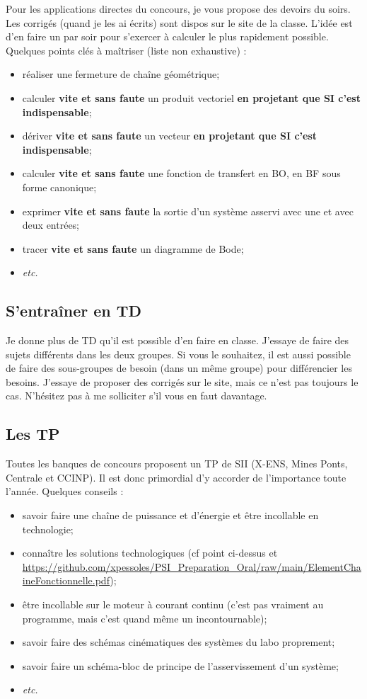 Pour les applications directes du concours, je vous propose des devoirs du soirs. Les corrigés (quand je les ai écrits) sont dispos sur le site de la classe. L'idée est d'en faire un par soir pour s'exercer à calculer le plus rapidement possible. Quelques points clés à maîtriser (liste non exhaustive) : 
\begin{itemize}
\item réaliser une fermeture de chaîne géométrique;
\item calculer \textbf{vite et sans faute} un produit vectoriel \textbf{en projetant que SI c'est indispensable};
\item dériver \textbf{vite et sans faute} un vecteur \textbf{en projetant que SI c'est indispensable};
\item calculer \textbf{vite et sans faute} une fonction de transfert en BO, en BF sous forme canonique;
\item exprimer \textbf{vite et sans faute} la sortie d'un système asservi avec une et avec deux entrées;
\item tracer \textbf{vite et sans faute} un diagramme de Bode;
\item \textit{etc.}
\end{itemize}

\subsection{S'entraîner en TD}
Je donne plus de TD qu'il est possible d'en faire en classe. J'essaye de faire des sujets différents dans les deux groupes. Si vous le souhaitez, il est aussi possible de faire des sous-groupes de besoin (dans un même groupe) pour différencier les besoins.
J'essaye de proposer des corrigés sur le site, mais ce n'est pas toujours le cas. N'hésitez pas à me solliciter s'il vous en faut davantage. 

\subsection{Les TP}
Toutes les banques de concours proposent un TP de SII (X-ENS, Mines Ponts, Centrale et CCINP). 
Il est donc primordial d'y accorder de l'importance toute l'année. Quelques conseils :
\begin{itemize}
\item savoir faire une chaîne de puissance et d'énergie et être incollable en technologie;
\item connaître les solutions technologiques (cf point ci-dessus et \url{https://github.com/xpessoles/PSI_Preparation_Oral/raw/main/ElementChaineFonctionnelle.pdf});
\item être incollable sur le moteur à courant continu (c'est pas vraiment au programme, mais c'est quand même un incontournable);
\item savoir faire des schémas cinématiques des systèmes du labo proprement;
\item savoir faire un schéma-bloc de principe de l'asservissement d'un système;
\item \textit{etc.}
\end{itemize}

